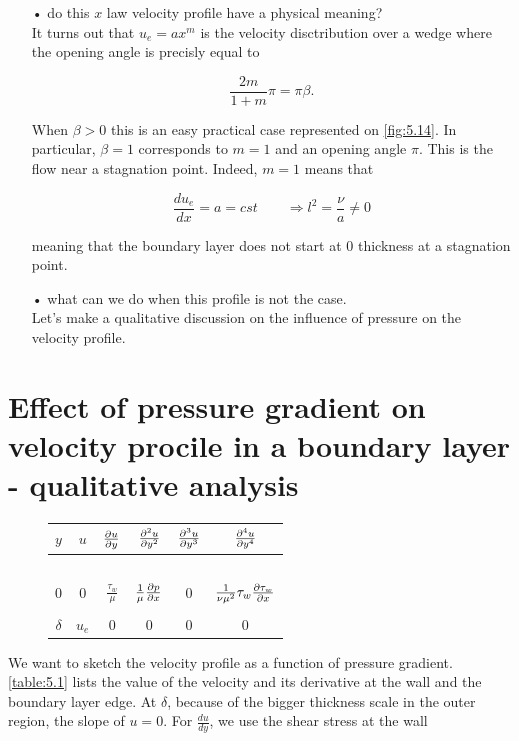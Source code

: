 			\begin{itemize}
				\item[•] do this $x$ law velocity profile have a physical meaning?\\
				It turns out that $u_e = a x^m$ is the velocity disctribution over a wedge where the opening angle is precisly equal to 

				\begin{equation}
					\frac{2m}{1+m} \pi = \pi \beta .
				\end{equation} 
				
					When $\beta > 0$ this is an easy practical case represented on \autoref{fig:5.14}. In particular, $\beta =1$ corresponds to $m=1$ and an opening angle $\pi$. This is the flow near a stagnation point. Indeed, $m = 1$ means that 
					
					\begin{equation}
						\frac{du_e}{dx} = a = cst \qquad \Rightarrow l^2 = \frac{\nu}{a} \neq 0 
					\end{equation}
					
					meaning that the boundary layer does not start at 0 thickness at a stagnation point. \\
				
				\item[•] what can we do when this profile is not the case. \\
				Let's make a qualitative discussion on the influence of pressure on the velocity profile. 
			\end{itemize}			   
			
			
\section{Effect of pressure gradient on velocity procile in a boundary layer - qualitative analysis}
		
	\begin{figure}
	\vspace{-5mm}
	\begin{tabular}{c|ccccc}
	 $y$ & $u$ & $\frac{\partial u}{\partial y}$ & $\frac{\partial ^2 u}{\partial y^2}$ & $\frac{\partial ^3 u}{\partial y^3}$ & $\frac{\partial ^4 u}{\partial y^4}$ \\
	 \hline 
	 	 \ \\ $0$       & 0 & $\frac{\tau _w}{\mu}$ & $\frac{1}{\mu}\frac{\partial p}{\partial x}$ & 0 & $\frac{1}{\nu \mu ^2}\tau _w \frac{\partial\tau _w}{\partial x}$  \\ \\
	 $\delta$ & $u_e$ & 0 & 0 & 0 & 0 \\ 
	 \hline 
	 \end{tabular}  
	 \label{table:5.1}
	 \end{figure}
	We want to sketch the velocity profile as a function of pressure gradient. \autoref{table:5.1} lists the value of the velocity and its derivative at the wall and the boundary layer edge. At $\delta$, because of the bigger thickness scale in the outer region, the slope of $u = 0$. For $\frac{du}{dy}$, we use the shear stress at the wall

